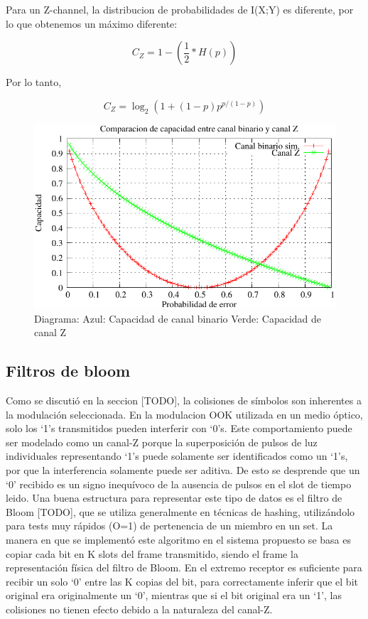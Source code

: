 Para un Z-channel, la distribucion de probabilidades de I(X;Y) es diferente, por lo que obtenemos un máximo diferente:

$$ C_{Z} = 1 - \left(\frac{1}{2}*H(p)\right) $$ \cite{tallini}

Por lo tanto,

$$ C_{Z} = \log_2\left(1+(1-p) p^{p/(1-p)}\right) $$


\begin{figure}[th]
  \begin{center}
    \includegraphics[scale=0.9]{capacidad/comparacionBZ}
  \end{center}
  \caption{Diagrama: Azul: Capacidad de canal binario Verde: Capacidad de canal Z}
  \label{fig:CompBZ}
\end{figure}


\subsection{Filtros de bloom}
Como se discutió en la seccion [TODO], la colisiones de símbolos son inherentes a la modulación seleccionada.
En la modulacion OOK utilizada en un medio óptico, solo los ‘1’s transmitidos pueden interferir con ‘0’s.
Este comportamiento puede ser modelado como un canal-Z porque la superposición de pulsos de luz individuales representando ‘1’s puede solamente ser identificados como un ‘1’s, por que la interferencia solamente puede ser aditiva. De esto se desprende que un ‘0’ recibido es un signo inequívoco de la ausencia de pulsos en el slot de tiempo leido.
Una buena estructura para representar este tipo de datos es el filtro de Bloom [TODO], que se utiliza generalmente en técnicas de hashing, utilizándolo para tests muy rápidos (O=1) de pertenencia de un miembro en un set.
La manera en que se implementó este algoritmo en el sistema propuesto se basa es copiar cada bit en K slots del frame transmitido, siendo el frame la representación física del filtro de Bloom. 
En el extremo receptor es suficiente para recibir un solo ‘0’ entre las K copias del bit, para correctamente inferir que el bit original era originalmente un ‘0’, mientras que si el bit original era un ‘1’, las colisiones no tienen efecto debido a la naturaleza del canal-Z.

